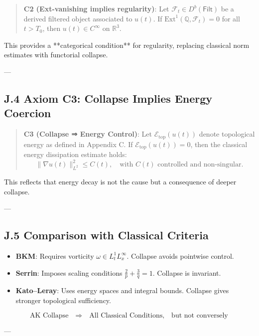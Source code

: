 \begin{quote}
\textbf{C2 (Ext-vanishing implies regularity)}:  
Let \( \mathcal{F}_t \in D^b(\mathsf{Filt}) \) be a derived filtered object associated to \( u(t) \).  
If \( \mathrm{Ext}^1(\mathbb{Q}, \mathcal{F}_t) = 0 \) for all \( t > T_0 \),  
then \( u(t) \in C^\infty \) on \( \mathbb{R}^3 \).
\end{quote}

This provides a **categorical condition** for regularity, replacing classical norm estimates with functorial collapse.

---

\subsection*{J.4 Axiom C3: Collapse Implies Energy Coercion}

\begin{quote}
\textbf{C3 (Collapse ⇒ Energy Control)}:  
Let \( \mathcal{E}_{\text{top}}(u(t)) \) denote topological energy as defined in Appendix C.  
If \( \mathcal{E}_{\text{top}}(u(t)) = 0 \), then the classical energy dissipation estimate holds:
\[
\|\nabla u(t)\|_{L^2}^2 \leq C(t), \quad \text{with } C(t) \text{ controlled and non-singular}.
\]
\end{quote}

This reflects that energy decay is not the cause but a consequence of deeper collapse.

---

\subsection*{J.5 Comparison with Classical Criteria}

\begin{itemize}
  \item \textbf{BKM}: Requires vorticity \( \omega \in L^1_t L^\infty_x \). Collapse avoids pointwise control.
  \item \textbf{Serrin}: Imposes scaling conditions \( \frac{2}{p} + \frac{3}{q} = 1 \). Collapse is invariant.
  \item \textbf{Kato–Leray}: Uses energy spaces and integral bounds. Collapse gives stronger topological sufficiency.
\end{itemize}

\[
\boxed{
\text{AK Collapse} \quad \textbf{⇒} \quad \text{All Classical Conditions},
\quad \text{but not conversely}
}
\]

---

